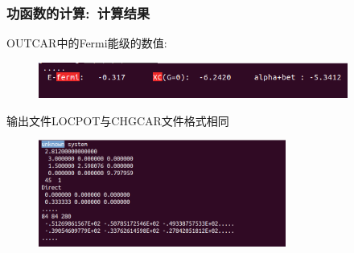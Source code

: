 {
\frametitle{\rm{功函数的计算:~计算结果}}
\textrm{OUTCAR}中的\textrm{Fermi}能级的数值:
\begin{figure}[h!]
\centering
\vskip -3pt
\includegraphics[width=4.0in,viewport=0 20 460 50,clip]{Figures/Pt_surface-workfunction-Fermi.png}
\caption{\fontsize{6.2pt}{5.2pt}}%
\label{Pt_surface-workfunction-LOCPOT-1}
\end{figure}
输出文件\textrm{LOCPOT}与\textrm{CHGCAR}文件格式相同\\
{\fontsize{6.2pt}{5.2pt}}
\begin{figure}[h!]
	\vskip -5pt
\centering
\includegraphics[width=3.2in,viewport=0 10 480 250,clip]{Figures/Pt_surface-workfunction-LOCPOT.png}
\caption{\fontsize{6.2pt}{5.2pt}}%
\label{Pt_surface-workfunction-LOCPOT-2}
\end{figure}
}

